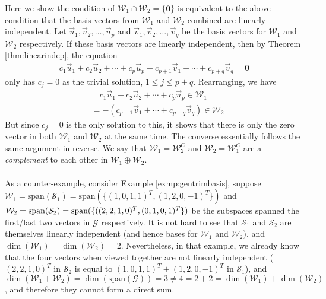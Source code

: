 Here we show the condition of $\mathcal{W}_1 \cap \mathcal{W}_2 = \{\textbf{0}\}$ is equivalent to the above condition that the basis vectors from $\mathcal{W}_1$ and $\mathcal{W}_2$ combined are linearly independent. Let $\vec{u}_1, \vec{u}_2, \ldots, \vec{u}_p$ and $\vec{v}_1, \vec{v}_2, \ldots, \vec{v}_q$ be the basis vectors for $\mathcal{W}_1$ and $\mathcal{W}_2$ respectively. If these basis vectors are linearly independent, then by Theorem \ref{thm:linearindep}, the equation
\begin{align*}
c_1\vec{u}_1 + c_2\vec{u}_2 + \cdots + c_p\vec{u}_p + c_{p+1}\vec{v}_1 + \cdots + c_{p+q}\vec{v}_q = \textbf{0}
\end{align*}
only has $c_j = 0$ as the trivial solution, $1 \leq j \leq p+q$. Rearranging, we have
\begin{align*}
&\quad c_1\vec{u}_1 + c_2\vec{u}_2 + \cdots + c_p\vec{u}_p \in \mathcal{W}_1 \\
&= -(c_{p+1}\vec{v}_1 + \cdots + c_{p+q}\vec{v}_q) \in \mathcal{W}_2
\end{align*}
But since $c_j = 0$ is the only solution to this, it shows that there is only the zero vector in both $\mathcal{W}_1$ and $\mathcal{W}_2$ at the same time. The converse essentially follows the same argument in reverse. We say that $\mathcal{W}_1 = \mathcal{W}_2^C$ and $\mathcal{W}_2 = \mathcal{W}_1^C$ are a \textit{complement} to each other in $\mathcal{W}_1 \oplus \mathcal{W}_2$.\\
\\
As a counter-example, consider Example \ref{exmp:gentrimbasis}, suppose $\mathcal{W}_1 = \text{span}(\mathcal{S}_1) = \text{span}(\{(1,0,1,1)^T, (1,2,0,-1)^T\})$ and $\mathcal{W}_2 = \text{span}(\mathcal{S}_2) = \text{span}(\{((2,2,1,0)^T, \\ (0,1,0,1)^T\})$ be the subspaces spanned the first/last two vectors in $\mathcal{G}$ respectively. It is not hard to see that $\mathcal{S}_1$ and $\mathcal{S}_2$ are themselves linearly independent (and hence bases for $\mathcal{W}_1$ and $\mathcal{W}_2$), and $\dim(\mathcal{W}_1) = \dim(\mathcal{W}_2) = 2$. Nevertheless, in that example, we already know that the four vectors when viewed together are not linearly independent ($(2,2,1,0)^T$ in $\mathcal{S}_2$ is equal to $(1,0,1,1)^T + (1,2,0,-1)^T$ in $\mathcal{S}_1$), and $\dim(\mathcal{W}_1 + \mathcal{W}_2) = \dim(\text{span}(\mathcal{G})) = 3 \neq 4 = 2+2 = \dim(\mathcal{W}_1) + \dim(\mathcal{W}_2)$, and therefore they cannot form a direct sum.\\
\\
